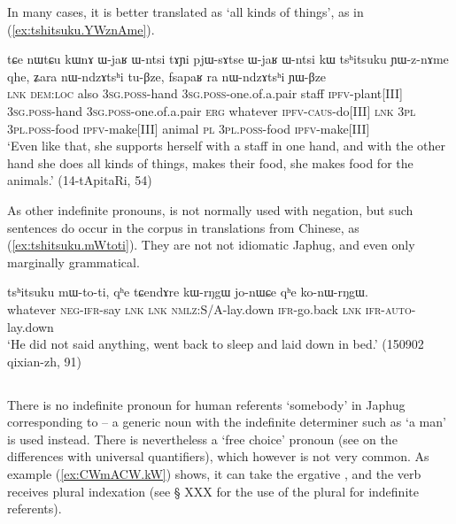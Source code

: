 In many cases, it is better translated as `all kinds of things', as in (\ref{ex:tshitsuku.YWznAme}).

\begin{exe}
\ex \label{ex:tshitsuku.YWznAme}
\gll  
tɕe nɯtɕu kɯnɤ ɯ-jaʁ ɯ-ntsi tɤɲi pjɯ-sɤtse  ɯ-jaʁ ɯ-ntsi kɯ tsʰitsuku ɲɯ-z-nɤme qhe, ʑara nɯ-ndzɤtsʰi tu-βze, fsapaʁ ra nɯ-ndzɤtsʰi ɲɯ-βze \\
\textsc{lnk} \textsc{dem:loc} also \textsc{3sg.poss}-hand \textsc{3sg.poss}-one.of.a.pair staff \textsc{ipfv}-plant[III]  \textsc{3sg.poss}-hand \textsc{3sg.poss}-one.of.a.pair \textsc{erg} whatever \textsc{ipfv-caus}-do[III] \textsc{lnk} \textsc{3pl} \textsc{3pl.poss}-food \textsc{ipfv}-make[III] animal \textsc{pl} \textsc{3pl.poss}-food \textsc{ipfv}-make[III]  \\
\glt `Even like that, she supports herself with a staff in one hand, and with the other hand she does all kinds of things, makes their food, she makes food for the animals.' (14-tApitaRi, 54)
\end{exe}

As other indefinite pronouns,  is not normally used with negation, but such sentences do occur in the corpus in translations from Chinese, as (\ref{ex:tshitsuku.mWtoti}). They are not not idiomatic Japhug, and even only marginally grammatical.

\begin{exe}
\ex \label{ex:tshitsuku.mWtoti}
\gll   tsʰitsuku mɯ-to-ti, qʰe tɕendɤre kɯ-rŋgɯ jo-nɯɕe qʰe ko-nɯ-rŋgɯ. \\
whatever \textsc{neg-ifr}-say \textsc{lnk} \textsc{lnk} \textsc{nmlz}:S/A-lay.down \textsc{ifr}-go.back \textsc{lnk} \textsc{ifr-auto}-lay.down \\
\glt `He did not said anything, went back to sleep and laid down in bed.' (150902 qixian-zh, 91)
\end{exe}

 \subsection{} \label{sex:CWmACW}
 There is no indefinite pronoun for human referents `somebody' in Japhug  corresponding to  -- a generic noun with the indefinite determiner  such as  `a man' is used instead. There is nevertheless a `free choice' pronoun  (see \citealt[48-52]{haspelmath97indef} on the differences with universal quantifiers), which however is not very common. As example (\ref{ex:CWmACW.kW}) shows, it can take the ergative , and the verb receives plural indexation (see § XXX for the use of the plural for indefinite referents). 
 
